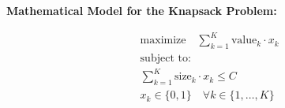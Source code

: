 \documentclass{article}
\begin{document}
\textbf{Mathematical Model for the Knapsack Problem:}

\begin{align*}
    & \text{maximize} \quad \sum_{k=1}^{K} \text{value}_k \cdot x_k \\
    & \text{subject to:} \\
    & \sum_{k=1}^{K} \text{size}_k \cdot x_k \leq C \\
    & x_k \in \{0, 1\} \quad \forall k \in \{1, \ldots, K\}
\end{align*}
\end{document}

